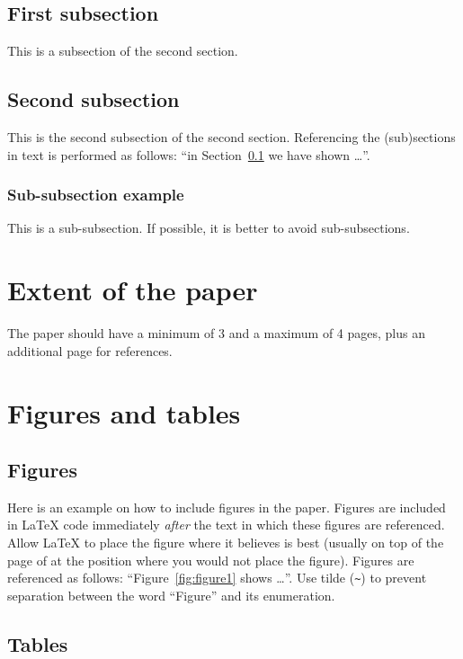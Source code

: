 \documentclass[10pt, a4paper]{article}
\begin{document}
\subsection{First subsection}
\label{sec:first}

This is a subsection of the second section.

\subsection{Second subsection}

This is the second subsection of the second section. Referencing the (sub)sections in text is performed as follows: ``in Section~\ref{sec:first} we have shown \dots''.

\subsubsection{Sub-subsection example}

This is a sub-subsection. If possible, it is better to avoid sub-subsections.

\section{Extent of the paper}

The paper should have a minimum of 3 and a maximum of 4 pages, plus an additional page for references.

\section{Figures and tables}

\subsection{Figures}

Here is an example on how to include figures in the paper. Figures are included in \LaTeX{} code immediately \textit{after} the text in which these figures are referenced. Allow \LaTeX{} to place the figure where it believes is best (usually on top of the page of at the position where you would not place the figure). Figures are referenced as follows: ``Figure~\ref{fig:figure1} shows \dots''. Use tilde (\verb.~.) to prevent separation between the word ``Figure'' and its enumeration.

\subsection{Tables}
\end{document}

